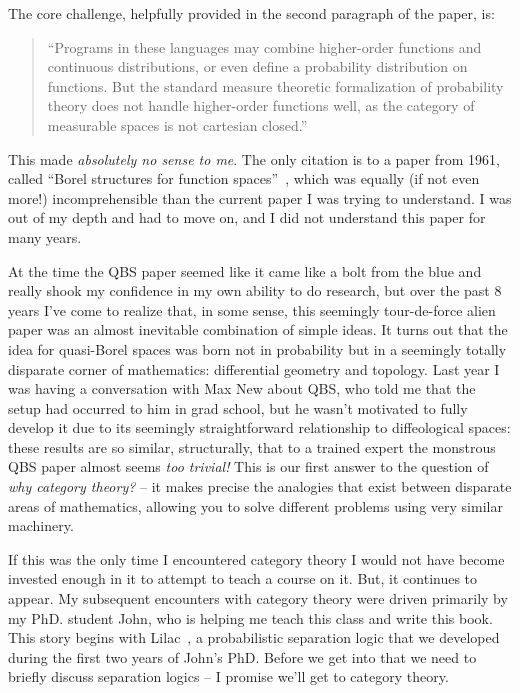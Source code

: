 The core challenge, helpfully provided in the second paragraph 
of the paper, is:

\begin{quotation}
  ``Programs in these languages may combine higher-order functions and
  continuous distributions, or even define a probability distribution on
  functions. But the standard measure theoretic formalization of probability
  theory does not handle
higher-order functions well, as the category of measurable
spaces is not cartesian closed.''~\citep{heunen2017convenient}
\end{quotation}

This made \emph{absolutely no sense to me}. The only citation is to a paper from 1961, called
``Borel structures for function spaces''~\citep{aumann1961borel}, which was
equally (if not even more!) incomprehensible than the current paper I was trying
to understand. I was out of my depth and had to move on, and I did not 
understand this paper for many years.

At the time the QBS paper seemed like it came like a bolt from the blue and
really shook my confidence in my own ability to do research, but over the past 8
years I've come to realize that, in some sense, this seemingly tour-de-force
alien paper was an almost inevitable combination of simple ideas.  It turns out
that the idea for quasi-Borel spaces was born not in probability but in a
seemingly totally disparate corner of mathematics: differential geometry and
topology. Last year I was having a conversation with Max New about QBS, who told me that the setup
had occurred to him in grad school, but he wasn't motivated to fully develop it due to its 
seemingly straightforward relationship to diffeological spaces: 
these results are so similar, structurally, that to a trained expert the monstrous
QBS paper almost seems \emph{too trivial!}
This is our first answer to the question of \emph{why category theory?} -- it makes precise the analogies 
that exist between disparate areas of mathematics, allowing you to solve different 
problems using very similar machinery.

If this was the only time I encountered category theory I would not have
become invested enough in it to attempt to teach a course on it. But, 
it continues to appear. My subsequent encounters with category 
theory were driven primarily by my PhD. student John, who is helping me 
teach this class and write this book. This story begins with Lilac~\citep{li2023lilac}, 
a probabilistic separation logic that we developed during the first two 
years of John's PhD. Before we get into that we need to briefly discuss 
separation logics -- I promise we'll get to category theory.

